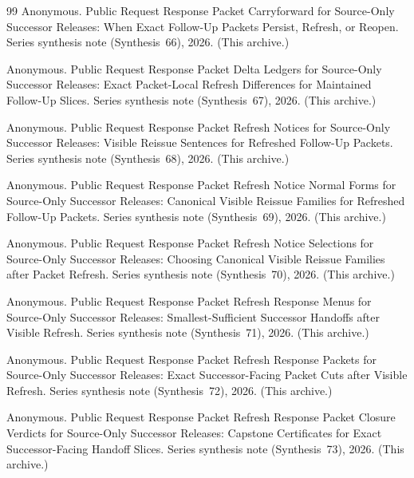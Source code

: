 \documentclass[11pt]{article}
\begin{document}
\begin{thebibliography}{99}
Anonymous.
\newblock Public Request Response Packet Carryforward for Source-Only Successor Releases: When Exact Follow-Up Packets Persist, Refresh, or Reopen.
\newblock Series synthesis note (Synthesis~66), 2026. (This archive.)

Anonymous.
\newblock Public Request Response Packet Delta Ledgers for Source-Only Successor Releases: Exact Packet-Local Refresh Differences for Maintained Follow-Up Slices.
\newblock Series synthesis note (Synthesis~67), 2026. (This archive.)

Anonymous.
\newblock Public Request Response Packet Refresh Notices for Source-Only Successor Releases: Visible Reissue Sentences for Refreshed Follow-Up Packets.
\newblock Series synthesis note (Synthesis~68), 2026. (This archive.)

Anonymous.
\newblock Public Request Response Packet Refresh Notice Normal Forms for Source-Only Successor Releases: Canonical Visible Reissue Families for Refreshed Follow-Up Packets.
\newblock Series synthesis note (Synthesis~69), 2026. (This archive.)

Anonymous.
\newblock Public Request Response Packet Refresh Notice Selections for Source-Only Successor Releases: Choosing Canonical Visible Reissue Families after Packet Refresh.
\newblock Series synthesis note (Synthesis~70), 2026. (This archive.)

Anonymous.
\newblock Public Request Response Packet Refresh Response Menus for Source-Only Successor Releases: Smallest-Sufficient Successor Handoffs after Visible Refresh.
\newblock Series synthesis note (Synthesis~71), 2026. (This archive.)

Anonymous.
\newblock Public Request Response Packet Refresh Response Packets for Source-Only Successor Releases: Exact Successor-Facing Packet Cuts after Visible Refresh.
\newblock Series synthesis note (Synthesis~72), 2026. (This archive.)

Anonymous.
\newblock Public Request Response Packet Refresh Response Packet Closure Verdicts for Source-Only Successor Releases: Capstone Certificates for Exact Successor-Facing Handoff Slices.
\newblock Series synthesis note (Synthesis~73), 2026. (This archive.)


\end{thebibliography}
\end{document}
